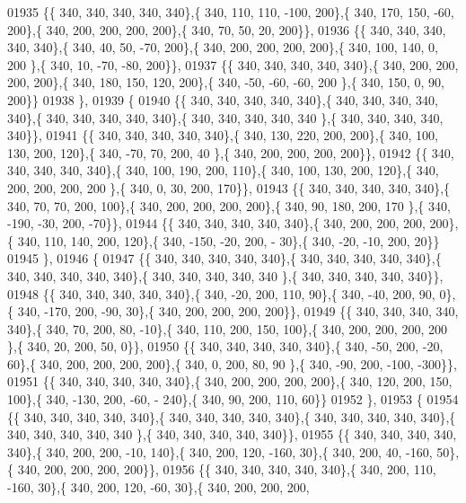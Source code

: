 \begin{DoxyCode}
01935 \{\{ 340, 340, 340, 340, 340\},\{ 340, 110, 110, -100, 200\},\{ 340, 170, 150, -60, 200\},\{ 340, 200, 200, 200, 
      200\},\{ 340,  70,  50,  20, 200\}\},
01936 \{\{ 340, 340, 340, 340, 340\},\{ 340,  40,  50, -70, 200\},\{ 340, 200, 200, 200, 200\},\{ 340, 100, 140,   0, 200
      \},\{ 340,  10, -70, -80, 200\}\},
01937 \{\{ 340, 340, 340, 340, 340\},\{ 340, 200, 200, 200, 200\},\{ 340, 180, 150, 120, 200\},\{ 340, -50, -60, -60, 200
      \},\{ 340, 150,   0,  90, 200\}\}
01938 \},
01939 \{
01940 \{\{ 340, 340, 340, 340, 340\},\{ 340, 340, 340, 340, 340\},\{ 340, 340, 340, 340, 340\},\{ 340, 340, 340, 340, 340
      \},\{ 340, 340, 340, 340, 340\}\},
01941 \{\{ 340, 340, 340, 340, 340\},\{ 340, 130, 220, 200, 200\},\{ 340, 100, 130, 200, 120\},\{ 340, -70,  70, 200,  40
      \},\{ 340, 200, 200, 200, 200\}\},
01942 \{\{ 340, 340, 340, 340, 340\},\{ 340, 100, 190, 200, 110\},\{ 340, 100, 130, 200, 120\},\{ 340, 200, 200, 200, 200
      \},\{ 340,   0,  30, 200, 170\}\},
01943 \{\{ 340, 340, 340, 340, 340\},\{ 340,  70,  70, 200, 100\},\{ 340, 200, 200, 200, 200\},\{ 340,  90, 180, 200, 170
      \},\{ 340, -190, -30, 200, -70\}\},
01944 \{\{ 340, 340, 340, 340, 340\},\{ 340, 200, 200, 200, 200\},\{ 340, 110, 140, 200, 120\},\{ 340, -150, -20, 200, -
      30\},\{ 340, -20, -10, 200,  20\}\}
01945 \},
01946 \{
01947 \{\{ 340, 340, 340, 340, 340\},\{ 340, 340, 340, 340, 340\},\{ 340, 340, 340, 340, 340\},\{ 340, 340, 340, 340, 340
      \},\{ 340, 340, 340, 340, 340\}\},
01948 \{\{ 340, 340, 340, 340, 340\},\{ 340, -20, 200, 110,  90\},\{ 340, -40, 200,  90,   0\},\{ 340, -170, 200, -90,  
      30\},\{ 340, 200, 200, 200, 200\}\},
01949 \{\{ 340, 340, 340, 340, 340\},\{ 340,  70, 200,  80, -10\},\{ 340, 110, 200, 150, 100\},\{ 340, 200, 200, 200, 200
      \},\{ 340,  20, 200,  50,   0\}\},
01950 \{\{ 340, 340, 340, 340, 340\},\{ 340, -50, 200, -20,  60\},\{ 340, 200, 200, 200, 200\},\{ 340,   0, 200,  80,  90
      \},\{ 340, -90, 200, -100, -300\}\},
01951 \{\{ 340, 340, 340, 340, 340\},\{ 340, 200, 200, 200, 200\},\{ 340, 120, 200, 150, 100\},\{ 340, -130, 200, -60, -
      240\},\{ 340,  90, 200, 110,  60\}\}
01952 \},
01953 \{
01954 \{\{ 340, 340, 340, 340, 340\},\{ 340, 340, 340, 340, 340\},\{ 340, 340, 340, 340, 340\},\{ 340, 340, 340, 340, 340
      \},\{ 340, 340, 340, 340, 340\}\},
01955 \{\{ 340, 340, 340, 340, 340\},\{ 340, 200, 200, -10, 140\},\{ 340, 200, 120, -160,  30\},\{ 340, 200,  40, -160,  
      50\},\{ 340, 200, 200, 200, 200\}\},
01956 \{\{ 340, 340, 340, 340, 340\},\{ 340, 200, 110, -160,  30\},\{ 340, 200, 120, -60,  30\},\{ 340, 200, 200, 200, 

\end{DoxyCode}

